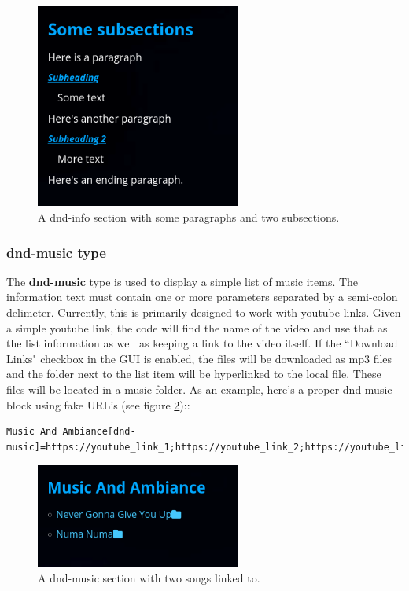 \begin{figure}[h]
	\centering
	\includegraphics[width=0.6\textwidth]{images/dnd-info-section-03.png}
	\caption{A dnd-info section with some paragraphs and two subsections.}
	\label{fig:dnd-info-fig-3}
\end{figure}

\subsubsection{dnd-music type}

The \textbf{dnd-music} type is used to display a simple list of music items. The information text must contain one or more parameters separated by a semi-colon delimeter. Currently, this is primarily designed to work with youtube links. Given a simple youtube link, the code will find the name of the video and use that as the list information as well as keeping a link to the video itself. If the ``Download Links" checkbox in the GUI is enabled, the files will be downloaded as mp3 files and the folder next to the list item will be hyperlinked to the local file. These files will be located in a music folder. As an example, here's a proper dnd-music block using fake URL's (see figure \ref{fig:dnd-music-fig})::

\begin{lstlisting}
Music And Ambiance[dnd-music]=https://youtube_link_1;https://youtube_link_2;https://youtube_link_3
\end{lstlisting}

\begin{figure}[h]
	\centering
	\includegraphics[width=0.6\textwidth]{images/dnd-music-section.png}
	\caption{A dnd-music section with two songs linked to.}
	\label{fig:dnd-music-fig}
\end{figure}


